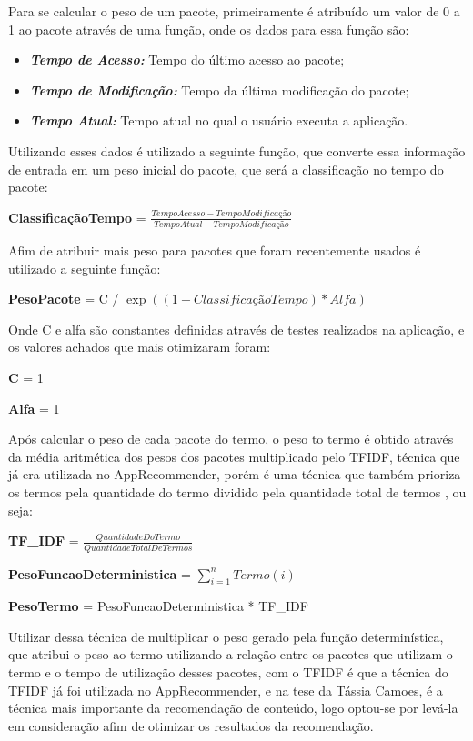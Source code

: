 Para se calcular o peso de um pacote, primeiramente é atribuído um valor de
0 a 1 ao pacote através de uma função, onde os dados para essa função são:

\begin{itemize}
  \item \textit{\textbf{Tempo de Acesso:}} Tempo do último acesso ao pacote;
  \item \textit{\textbf{Tempo de Modificação:}} Tempo da última modificação do pacote;
  \item \textit{\textbf{Tempo Atual:}} Tempo atual no qual o usuário executa a aplicação.
\end{itemize}

Utilizando esses dados é utilizado a seguinte função, que converte essa
informação de entrada em um peso inicial do pacote, que será a classificação
no tempo do pacote:

\textbf{ClassificaçãoTempo} = $\frac{TempoAcesso - TempoModificação}{TempoAtual -
TempoModificação}$

Afim de atribuir mais peso para pacotes que foram recentemente usados é
utilizado a seguinte função:

\textbf{PesoPacote} = C / $\exp\left(({1 - ClassificaçãoTempo}) * {Alfa}\right)$

Onde C e alfa são constantes definidas através de testes realizados na
aplicação, e os valores achados que mais otimizaram foram:

\textbf{C} = 1

\textbf{Alfa} = 1

Após calcular o peso de cada pacote do termo, o peso to termo é obtido
através da média aritmética dos pesos dos pacotes multiplicado pelo TFIDF,
técnica que já era utilizada no AppRecommender, porém é uma técnica que
também prioriza os termos pela quantidade do termo dividido pela quantidade
total de termos \cite{araujo2011apprecommender}, ou seja:

\textbf{TF\_IDF} = $\frac{QuantidadeDoTermo} {QuantidadeTotalDeTermos}$

\textbf{PesoFuncaoDeterministica} = $\sum_{i=1}^{n} Termo(i)$

\textbf{PesoTermo} = PesoFuncaoDeterministica * TF\_IDF

Utilizar dessa técnica de multiplicar o peso gerado pela função
determinística, que atribui o peso ao termo utilizando a relação entre os
pacotes que utilizam o termo e o tempo de utilização desses pacotes, com
o TFIDF é que a técnica do TFIDF já foi utilizada no AppRecommender, e na
tese da Tássia Camoes, é a técnica mais importante da recomendação de
conteúdo, logo optou-se por levá-la em consideração afim de otimizar os
resultados da recomendação.

